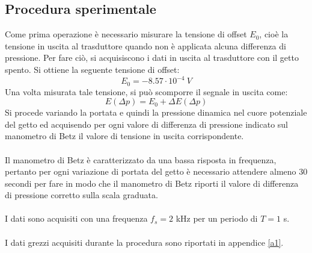 \subsection{Procedura sperimentale}
Come prima operazione è necessario misurare la tensione di offset $E_0$, cioè la tensione in uscita al trasduttore quando non è applicata alcuna differenza di pressione. Per fare ciò, si acquisiscono i dati in uscita al trasduttore con il getto spento. Si ottiene la seguente tensione di offset:
\begin{equation*}
    E_0 = -8.57\cdot 10^{-4}\ V
\end{equation*}
Una volta misurata tale tensione, si può scomporre il segnale in uscita come:
\begin{equation*}
    E(\Delta p) = E_0 + \Delta E(\Delta p)
\end{equation*}
Si procede variando la portata e quindi la pressione dinamica nel cuore potenziale del getto ed acquisendo per ogni valore di differenza di pressione indicato sul manometro di Betz il valore di tensione in uscita corrispondente.\\\\
Il manometro di Betz è caratterizzato da una bassa risposta in frequenza, pertanto per ogni variazione di portata del getto è necessario attendere almeno 30 secondi per fare in modo che il manometro di Betz riporti il valore di differenza di pressione corretto sulla scala graduata.\\\\
I dati sono acquisiti con una frequenza $f_s=2$ kHz per un periodo di $T=1$ s.\\\\
I dati grezzi acquisiti durante la procedura sono riportati in appendice \ref{a1}.\\\\

